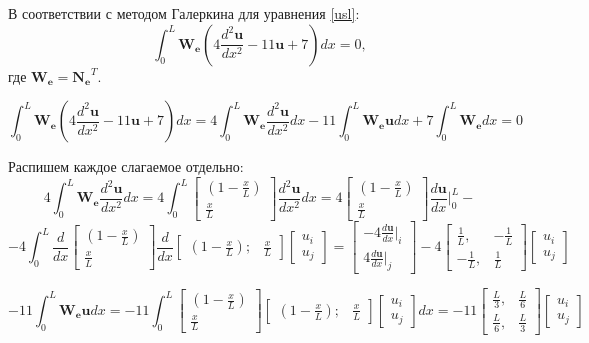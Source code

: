 В соответствии с методом Галеркина для уравнения \ref{usl}:
\begin{equation}\label{lin}
\int_0^L \mathbf{W_e}\left( 4\frac{d^2\mathbf{u}}{dx^2}   -11 \mathbf{u}     +7 \right) d x=0,
\end{equation}
где $\mathbf{W_e=N_e}^T$.

$$\int_0^L \mathbf{W_e}\left(4\frac{d^2\mathbf{u}}{dx^2}   -11 \mathbf{u}     +7 \right) d x= 4\int_0^L \mathbf{W_e} \frac{d^2 \mathbf{u}}{dx^2} dx    -11 \int_0^L \mathbf{W_e} \mathbf{u} d x     +7 \int_0^L \mathbf{W_e} d x=0$$

Распишем каждое слагаемое отдельно:
$$
4\int_0^L \mathbf{W_e} \frac{d^2 \mathbf{u}}{dx^2} dx=4\int_0^L
	\begin{bmatrix}
	(1-\frac{x}{L}) \\
	\frac{x}{L}
	\end{bmatrix}
\frac{d^2 \mathbf{u}}{dx^2} dx =
4
	\begin{bmatrix}
	(1-\frac{x}{L}) \\
	\frac{x}{L}
	\end{bmatrix}
\frac{d\mathbf{u}}{dx} |_0^L -
$$
$$
  -4  \int_0^L
\frac{d}{dx}
	\begin{bmatrix}
	(1-\frac{x}{L}) \\
	\frac{x}{L}
	\end{bmatrix}
\frac{d}{dx}
	\begin{bmatrix}
	(1-\frac{x}{L}); & \frac{x}{L}
	\end{bmatrix}
	\begin{bmatrix}
	u_i \\
	u_j
	\end{bmatrix}
=
	\begin{bmatrix}
	  -4 \frac{d\mathbf{u}}{dx}|_i \\
4\frac{d\mathbf{u}}{dx}|_j
	\end{bmatrix}   -4 
\begin{bmatrix}
\frac{1}{L}, & -\frac{1}{L} \\
-\frac{1}{L}, & \frac{1}{L}
\end{bmatrix}
\begin{bmatrix}
u_i \\
u_j
\end{bmatrix}
$$




$$  -11  
\int_0^L \mathbf{W_e} \mathbf{u} d x=
 -11  
\int_0^L \begin{bmatrix}
(1-\frac{x}{L}) \\
\frac{x}{L}
\end{bmatrix} \begin{bmatrix}
(1-\frac{x}{L}) ; & \frac{x}{L}
\end{bmatrix}\begin{bmatrix}
u_i \\
u_j
\end{bmatrix} d x=
 -11  
\begin{bmatrix}
\frac{L}{3}, & \frac{L}{6} \\
\frac{L}{6}, & \frac{L}{3}
\end{bmatrix}
\begin{bmatrix}
u_i \\
u_j
\end{bmatrix}
$$



